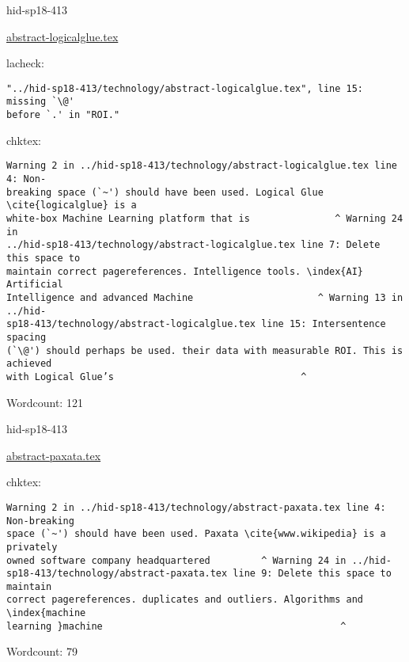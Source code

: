 

\begin{IU}

hid-sp18-413

\href{https://github.com/cloudmesh-community/hid-sp18-413/blob/master//technology/abstract-logicalglue.tex}{abstract-logicalglue.tex}

 
lacheck:
\begin{tiny}
\begin{verbatim}
"../hid-sp18-413/technology/abstract-logicalglue.tex", line 15: missing `\@'
before `.' in "ROI."
\end{verbatim}
\end{tiny}
chktex:
\begin{tiny}
\begin{verbatim}
Warning 2 in ../hid-sp18-413/technology/abstract-logicalglue.tex line 4: Non-
breaking space (`~') should have been used. Logical Glue \cite{logicalglue} is a
white-box Machine Learning platform that is               ^ Warning 24 in
../hid-sp18-413/technology/abstract-logicalglue.tex line 7: Delete this space to
maintain correct pagereferences. Intelligence tools. \index{AI} Artificial
Intelligence and advanced Machine                      ^ Warning 13 in ../hid-
sp18-413/technology/abstract-logicalglue.tex line 15: Intersentence spacing
(`\@') should perhaps be used. their data with measurable ROI. This is achieved
with Logical Glue’s                                 ^
\end{verbatim}
\end{tiny}

Wordcount: 121

\end{IU}



\begin{IU}

hid-sp18-413

\href{https://github.com/cloudmesh-community/hid-sp18-413/blob/master//technology/abstract-paxata.tex}{abstract-paxata.tex}

 
chktex:
\begin{tiny}
\begin{verbatim}
Warning 2 in ../hid-sp18-413/technology/abstract-paxata.tex line 4: Non-breaking
space (`~') should have been used. Paxata \cite{www.wikipedia} is a privately
owned software company headquartered         ^ Warning 24 in ../hid-
sp18-413/technology/abstract-paxata.tex line 9: Delete this space to maintain
correct pagereferences. duplicates and outliers. Algorithms and \index{machine
learning }machine                                          ^
\end{verbatim}
\end{tiny}

Wordcount: 79

\end{IU}


